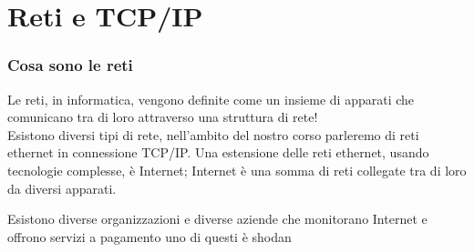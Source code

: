 \chapter{Reti e TCP/IP}	 %

\subsection{Cosa sono le reti}
Le reti, in informatica, vengono definite come un insieme di apparati che comunicano tra di loro attraverso una struttura di rete!\\
Esistono diversi tipi di rete, nell'ambito del nostro corso parleremo di reti ethernet in connessione TCP/IP.
Una estensione delle reti ethernet, usando tecnologie complesse, è Internet; Internet è una somma di reti collegate tra di loro da diversi apparati.

Esistono diverse organizzazioni e diverse aziende che monitorano Internet e offrono servizi a pagamento uno di questi è shodan \cite{shodandeveloper} \cite{shodand}


